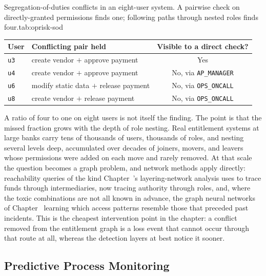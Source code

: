 \documentclass[../ai_in_finance]{subfiles}
\begin{document}
\begin{booktable}{Segregation-of-duties conflicts in an eight-user system. A pairwise check on directly-granted permissions finds one; following paths through nested roles finds four.}{tab:oprisk-sod}
\begin{tabular}{llc}
\toprule
User & Conflicting pair held & Visible to a direct check? \\
\midrule
\texttt{u3} & create vendor $+$ approve payment & Yes \\
\texttt{u4} & create vendor $+$ approve payment & No, via \texttt{AP\_MANAGER} \\
\texttt{u6} & modify static data $+$ release payment & No, via \texttt{OPS\_ONCALL} \\
\texttt{u8} & create vendor $+$ release payment & No, via \texttt{OPS\_ONCALL} \\
\bottomrule
\end{tabular}
\end{booktable}

A ratio of four to one on eight users is not itself the finding. The point is that the missed fraction grows with the depth of role nesting. Real entitlement systems at large banks carry tens of thousands of users, thousands of roles, and nesting several levels deep, accumulated over decades of joiners, movers, and leavers whose permissions were added on each move and rarely removed. At that scale the question becomes a graph problem, and network methods apply directly: reachability queries of the kind Chapter~'s layering-network analysis uses to trace funds through intermediaries, now tracing authority through roles, and, where the toxic combinations are not all known in advance, the graph neural networks of Chapter~ learning which access patterns resemble those that preceded past incidents. This is the cheapest intervention point in the chapter: a conflict removed from the entitlement graph is a loss event that cannot occur through that route at all, whereas the detection layers at best notice it sooner.

\subsection{Predictive Process Monitoring}
\label{sec:oprisk-predictive-process}
\end{document}
